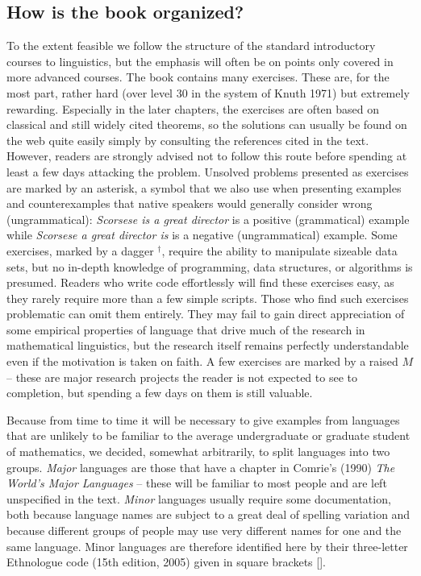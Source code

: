 \subsection*{How is the book organized?} 

To the extent feasible we follow the structure of the standard introductory
courses to linguistics, but the emphasis will often be on points only covered
in more advanced courses.  The book contains many exercises. These are, for
the most part, rather hard (over level 30 in the system of Knuth 1971)
\nocite{Knuth:1971} but extremely rewarding.  Especially in the later
chapters, the exercises are often based on classical and still widely cited
theorems, so the solutions can usually be found on the web quite easily simply
by consulting the references cited in the text. However, readers are strongly
advised not to follow this route before spending at least a few days attacking
the problem.  Unsolved problems presented as exercises are marked by an
asterisk, a symbol that we also use when presenting examples and
counterexamples that native speakers would generally consider wrong
(ungrammatical): {\it Scorsese is a great director} is a positive
(grammatical) example while {\it *Scorsese a great director is} is a negative
(ungrammatical) example.    Some
exercises, marked by a dagger $^\dagger$, require the ability to manipulate
sizeable data sets, but no in-depth knowledge of programming, data structures,
or algorithms is presumed. Readers who write code effortlessly will find these
exercises easy, as they rarely require more than a few simple scripts. Those
who find such exercises problematic can omit them entirely. They may fail to
gain direct appreciation of some empirical properties of language that drive
much of the research in mathematical linguistics, but the research itself
remains perfectly understandable even if the motivation is taken on faith. A
few exercises are marked by a raised $M$ -- these are major research projects
the reader is not expected to see to completion, but spending a few days on
them is still valuable. 

Because from time to time it will be necessary to give examples from languages
that are unlikely to be familiar to the average undergraduate or graduate
student of mathematics, we decided, somewhat arbitrarily, to split languages
into two groups. {\it Major} languages are those that have a chapter in
Comrie's (1990) {\it The World's Major Languages} \nocite{Comrie:1990} --
these will be familiar to most people and are left unspecified in the text.
{\it Minor} languages usually require some documentation, both because
language names are subject to a great deal of spelling variation and because
different groups of people may use very different names for one and the same
language. Minor languages are therefore identified here by their three-letter
Ethnologue code (15th edition, 2005) given in square brackets [].
\nocite{Gordon:2005}

